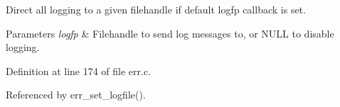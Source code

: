 Direct all logging to a given filehandle if default logfp callback is set. 


\begin{DoxyParams}{Parameters}
{\em logfp} & Filehandle to send log messages to, or N\-U\-L\-L to disable logging. \\
\hline
\end{DoxyParams}


Definition at line 174 of file err.\-c.



Referenced by err\-\_\-set\-\_\-logfile().

